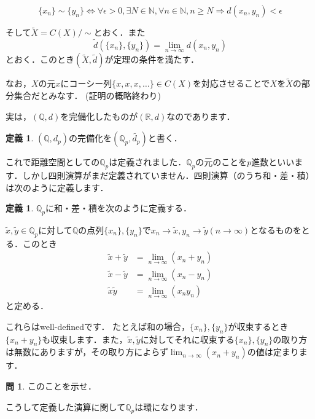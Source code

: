 \documentclass[uplatex]{jsarticle}
\newcommand{\Q}{\mathbb{Q}}
\newcommand{\R}{\mathbb{R}}
\theoremstyle{definition} %
\newtheorem{defi}[thm]{定義}
\newtheorem*{exercise*}{問}
\begin{document}
\[\{x_n\} \sim \{y_n\} \iff \forall \epsilon > 0, \exists N \in \mathbb{N}, \forall n \in \mathbb{N}, n \geq N \Rightarrow d(x_n, y_n) < \epsilon\]

そして$\tilde{X} = C(X)/{\sim}$とおく．また
\[\tilde{d}(\{x_n\}, \{y_n\}) = \lim_{n\to\infty} d(x_n, y_n)\]
とおく．このとき$(\tilde{X}, \tilde{d})$が定理の条件を満たす． 

なお，$X$の元$x$にコーシー列$\{x, x, x, \dots\} \in C(X)$を対応させることで$X$を$\tilde{X}$の部分集合だとみなす． (証明の概略終わり)

実は，$(\Q, d)$を完備化したものが$(\R, d)$なのであります．

\begin{oframed}\begin{defi}
$(\Q, d_p)$の完備化を$(\Q_p, \tilde{d_p})$と書く．
\end{defi}\end{oframed}

これで距離空間としての$\Q_p$は定義されました．$\Q_p$の元のことを$p$進数といいます．しかし四則演算がまだ定義されていません．四則演算（のうち和・差・積）は次のように定義します．

\begin{oframed}\begin{defi}
$\Q_p$に和・差・積を次のように定義する．

$\tilde{x}, \tilde{y} \in \Q_p$に対して$\Q$の点列$\{x_n\}, \{y_n\}$で$x_n \to \tilde{x}, y_n \to \tilde{y} (n \to \infty)$となるものをとる．このとき
\begin{align*}
\tilde{x} + \tilde{y} &= \lim_{n\to\infty} (x_n + y_n) \\
\tilde{x} - \tilde{y} &= \lim_{n\to\infty} (x_n - y_n) \\
\tilde{x} \tilde{y} &= \lim_{n\to\infty} (x_n y_n)
\end{align*}
と定める．
\end{defi}\end{oframed}

これらはwell-definedです．
たとえば和の場合，$\{x_n\}, \{y_n\}$が収束するとき$\{x_n + y_n\}$も収束します．また，$\tilde{x}, \tilde{y}$に対してそれに収束する$\{x_n\}, \{y_n\}$の取り方は無数にありますが，その取り方によらず$\lim_{n\to\infty} (x_n + y_n)$の値は定まります．

\begin{exercise*}
このことを示せ．
\end{exercise*}


こうして定義した演算に関して$\Q_p$は環になります．
\end{document}
